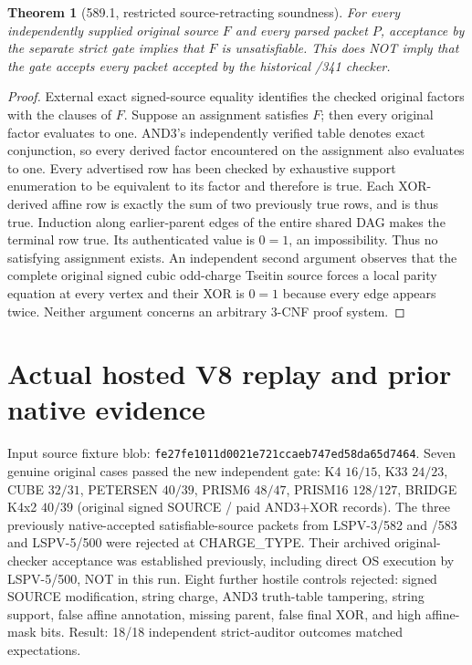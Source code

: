 \documentclass[10pt]{article}
\newtheorem{theorem}{Theorem}
\begin{document}
\begin{theorem}[589.1, restricted source-retracting soundness]
For every independently supplied original source $F$ and every parsed packet $P$, acceptance by the separate strict gate implies that $F$ is unsatisfiable. This does NOT imply that the gate accepts every packet accepted by the historical /341 checker.
\end{theorem}
\begin{proof}
External exact signed-source equality identifies the checked original factors with the clauses of $F$. Suppose an assignment satisfies $F$; then every original factor evaluates to one. AND3's independently verified table denotes exact conjunction, so every derived factor encountered on the assignment also evaluates to one. Every advertised row has been checked by exhaustive support enumeration to be equivalent to its factor and therefore is true. Each XOR-derived affine row is exactly the sum of two previously true rows, and is thus true. Induction along earlier-parent edges of the entire shared DAG makes the terminal row true. Its authenticated value is $0=1$, an impossibility. Thus no satisfying assignment exists. An independent second argument observes that the complete original signed cubic odd-charge Tseitin source forces a local parity equation at every vertex and their XOR is $0=1$ because every edge appears twice. Neither argument concerns an arbitrary 3-CNF proof system.
\end{proof}

\section*{Actual hosted V8 replay and prior native evidence}
Input source fixture blob:
\texttt{fe27fe1011d0021e721ccaeb747ed58da65d7464}.
Seven genuine original cases passed the new independent gate: K4 $16/15$, K33 $24/23$, CUBE $32/31$, PETERSEN $40/39$, PRISM6 $48/47$, PRISM16 $128/127$, BRIDGE K4x2 $40/39$ (original signed SOURCE / paid AND3+XOR records).
The three previously native-accepted satisfiable-source packets from LSPV-3/582 and /583 and LSPV-5/500 were rejected at CHARGE\_TYPE. Their archived original-checker acceptance was established previously, including direct OS execution by LSPV-5/500, NOT in this run. Eight further hostile controls rejected: signed SOURCE modification, string charge, AND3 truth-table tampering, string support, false affine annotation, missing parent, false final XOR, and high affine-mask bits. Result: 18/18 independent strict-auditor outcomes matched expectations.
\end{document}
